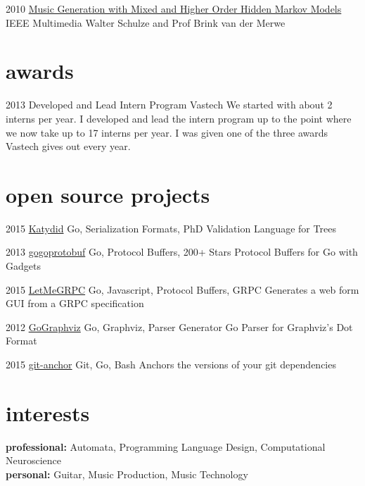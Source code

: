 \documentclass[print]{friggeri-cv} %
\begin{document}

\begin{entrylist}

\entry
{2010}
{\href{http://doi.ieeecomputersociety.org/10.1109/MMUL.2010.44}{Music Generation with Mixed and Higher Order Hidden Markov Models}}
{IEEE Multimedia}
{Walter Schulze and Prof Brink van der Merwe}

\end{entrylist}

\section{awards}

\begin{entrylist}

\entry
{2013}
{Developed and Lead Intern Program}
{Vastech}
{We started with about 2 interns per year. I developed and lead the intern program up to the point where we now take up to 17 interns per year.  I was given one of the three awards Vastech gives out every year.}

\end{entrylist}

\section{open source projects}


\begin{entrylist}

\entry
{2015}
{\href{https://github.com/katydid/katydid}{Katydid}}
{Go, Serialization Formats, PhD}
{Validation Language for Trees}

\entry
{2013}
{\href{https://github.com/gogo/protobuf}{gogoprotobuf}}
{Go, Protocol Buffers, 200+ Stars}
{Protocol Buffers for Go with Gadgets}

\entry
{2015}
{\href{https://github.com/gogo/letmegrpc}{LetMeGRPC}}
{Go, Javascript, Protocol Buffers, GRPC}
{Generates a web form GUI from a GRPC specification}

\entry
{2012}
{\href{https://github.com/awalterschulze/gographviz}{GoGraphviz}}
{Go, Graphviz, Parser Generator}
{Go Parser for Graphviz's Dot Format}

\entry
{2015}
{\href{https://github.com/awalterschulze/git-anchor}{git-anchor}}
{Git, Go, Bash}
{Anchors the versions of your git dependencies}

\end{entrylist}

\section{interests}

\textbf{professional:} Automata, Programming Language Design, Computational Neuroscience \\
\textbf{personal:} Guitar, Music Production, Music Technology
\end{document}
